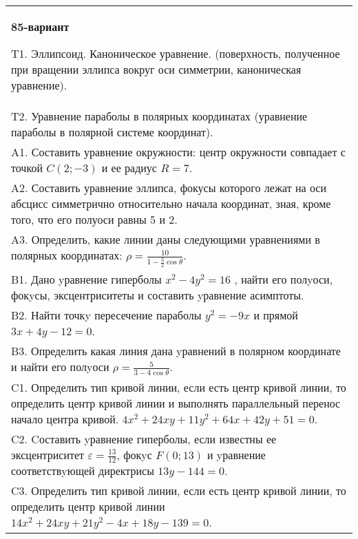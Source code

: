 \documentclass{article}
\begin{document}
\begin{tabular}{m{17cm}}
\textbf{85-вариант}
\newline

T1. Эллипсоид. Каноническое уравнение. (поверхность, полученное при вращении эллипса вокруг оси симметрии, каноническая уравнение).\\

T2. Уравнение параболы в полярных координатах (уравнение параболы в полярной системе координат).\\

A1. Составить уравнение окружности: центр окружности совпадает с точкой $C(2;-3)$ и ее радиус $R=7$.\\

A2. Составить уравнение эллипса, фокусы которого лежат на оси абсцисс симметрично относительно начала координат, зная, кроме того, что его полуоси равны 5 и 2.\\

A3. Определить, какие линии даны следующими уравнениями в полярных координатах: $\rho=\frac{10}{1-\frac{3}{2}\cos\theta}$.\\

B1. Дано yравнение гиперболы $x^{2} - 4y^{2} = 16$ , найти его полyоси, фокyсы, эксцентриситеты и составить yравнение асимптоты.\\

B2. Найти точкy пересечение параболы $y^{2} = - 9x$ и прямой $3x + 4y - 12 = 0$.  \\

B3. Определить какая линия дана yравнений в полярном координате и найти его полyоси $\rho = \frac{5}{3 - 4\cos\theta}$.  \\

C1. Определить тип кривой линии, если есть центр кривой линии, то определить центр кривой линии и выполнять параллельный перенос начало центра кривой. $4x^{2}+24xy+11y^{2}+64x+42y+51=0$.  \\

C2. Cоставить yравнение гиперболы, если известны ее эксцентриситет $\varepsilon=\frac{13}{12}$, фокyс $F(0;13)$ и yравнение соответствyющей директрисы $13y-144=0$.  \\

C3. Определить тип кривой линии, если есть центр кривой линии, то определить центр кривой линии $14x^{2}+24xy+21y^{2}-4x+18y-139=0$.  \\

\end{tabular}
\vspace{1cm}
\end{document}
